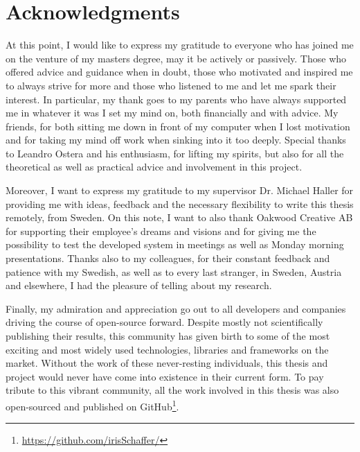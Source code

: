 \chapter{Acknowledgments}
At this point, I would like to express my gratitude to everyone who has joined me on the venture of my masters degree, may it be actively or passively. Those who offered advice and guidance when in doubt, those who motivated and inspired me to always strive for more and those who listened to me and let me spark their interest. In particular, my thank goes to my parents who have always supported me in whatever it was I set my mind on, both financially and with advice. My friends, for both sitting me down in front of my computer when I lost motivation and for taking my mind off work when sinking into it too deeply. Special thanks to Leandro Ostera and his enthusiasm, for lifting my spirits, but also for all the theoretical as well as practical advice and involvement in this project.

Moreover, I want to express my gratitude to my supervisor Dr. Michael Haller for providing me with ideas, feedback and the necessary flexibility to write this thesis remotely, from Sweden. On this note, I want to also thank Oakwood Creative AB for supporting their employee's dreams and visions and for giving me the possibility to test the developed system in meetings as well as Monday morning presentations. Thanks also to my colleagues, for their constant feedback and patience with my Swedish, as well as to every last stranger, in Sweden, Austria and elsewhere, I had the pleasure of telling about my research.

Finally, my admiration and appreciation go out to all developers and companies driving the course of open-source forward. Despite mostly not scientifically publishing their results, this community has given birth to some of the most exciting and most widely used technologies, libraries and frameworks on the market. Without the work of these never-resting individuals, this thesis and project would never have come into existence in their current form. To pay tribute to this vibrant community, all the work involved in this thesis was also open-sourced and published on GitHub\footnote{\href{https://github.com/irisSchaffer?tab=repositories}{\textsf{https://github.com/irisSchaffer/}}}.
